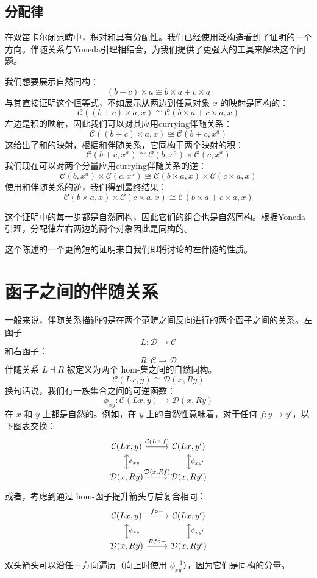 \documentclass[DaoFP]{subfiles}
\begin{document}
\subsection{分配律}

在双笛卡尔闭范畴中，积对和具有分配性。我们已经使用泛构造看到了证明的一个方向。伴随关系与Yoneda引理相结合，为我们提供了更强大的工具来解决这个问题。

我们想要展示自然同构：
\[(b + c) \times a \cong b \times a + c \times a \]
与其直接证明这个恒等式，不如展示从两边到任意对象 $x$ 的映射是同构的：
\[  \mathcal{C} ((b + c) \times a, x) \cong \mathcal{C}(b \times a + c \times a, x) \]
左边是积的映射，因此我们可以对其应用currying伴随关系：
\[  \mathcal{C} ((b + c) \times a, x) \cong \mathcal{C}(b + c, x^a) \]
这给出了和的映射，根据和伴随关系，它同构于两个映射的积：
\[  \mathcal{C}(b + c, x^a) \cong \mathcal{C}(b, x^a) \times \mathcal{C}(c, x^a)\]
我们现在可以对两个分量应用currying伴随关系的逆：
\[  \mathcal{C}(b, x^a) \times \mathcal{C}(c, x^a) \cong \mathcal{C}(b \times a, x) \times \mathcal{C}(c \times a, x)\]
使用和伴随关系的逆，我们得到最终结果：
\[ \mathcal{C}(b \times a, x) \times \mathcal{C}(c \times a, x) \cong \mathcal{C}(b \times a + c \times a, x) \]

这个证明中的每一步都是自然同构，因此它们的组合也是自然同构。根据Yoneda引理，分配律左右两边的两个对象因此是同构的。

这个陈述的一个更简短的证明来自我们即将讨论的左伴随的性质。

\section{函子之间的伴随关系}

一般来说，伴随关系描述的是在两个范畴之间反向进行的两个函子之间的关系。左函子
\[ L \colon \mathcal{D} \to \mathcal{C}\]
和右函子：
\[ R \colon \mathcal{C} \to  \mathcal{D} \]
伴随关系 $L \dashv R$ 被定义为两个 hom-集之间的自然同构。
\[  \mathcal{C} (L x, y) \cong \mathcal{D}( x , R y)\]
换句话说，我们有一族集合之间的可逆函数：
\[ \phi_{x y} \colon  \mathcal{C} (L x, y) \to \mathcal{D}( x , R y) \]
在 $x$ 和 $y$ 上都是自然的。例如，在 $y$ 上的自然性意味着，对于任何 $f \colon y \to y'$，以下图表交换：
\[
 \begin{tikzcd}
 \mathcal{C}(L x, y)
 \arrow[d, leftrightarrow, "\phi_{x y}"]
 \arrow[r, "{\mathcal{C}(L x, f)}"]
 &
 \mathcal{C}(L x, y')
  \arrow[d, leftrightarrow, "\phi_{x y'}"]
 \\
 \mathcal{D}(x, R y)
 \arrow[r, "{\mathcal{D}(x, R f)}"]
& \mathcal{D}(x, R y')
 \end{tikzcd}
\]
或者，考虑到通过 hom-函子提升箭头与后复合相同：
\[
 \begin{tikzcd}
 \mathcal{C}(L x, y)
 \arrow[d, leftrightarrow, "\phi_{x y}"]
 \arrow[r, "f \circ -"]
 &
 \mathcal{C}(L x, y')
  \arrow[d, leftrightarrow, "\phi_{x y'}"]
 \\
 \mathcal{D}(x, R y)
 \arrow[r, "R f \circ -"]
& \mathcal{D}(x, R y')
 \end{tikzcd}
\]
双头箭头可以沿任一方向遍历（向上时使用 $\phi^{-1}_{x y}$），因为它们是同构的分量。
\end{document}
